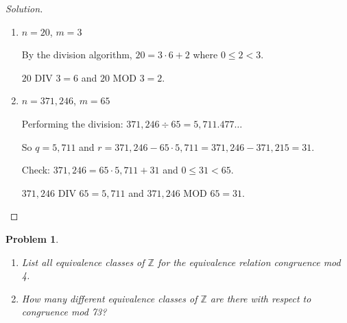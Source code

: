 \documentclass[12pt]{article}
\newtheorem{problem}{Problem}
\newcommand{\ZZ}{\ensuremath{\mathbb Z}}
\begin{document}
\begin{proof}[Solution]
~
\begin{enumerate}[label=(\alph*)]
    \item $n = 20$, $m = 3$
    
    By the division algorithm, $20 = 3 \cdot 6 + 2$ where $0 \leq 2 < 3$.
    
    $20$ DIV $3 = 6$ and $20$ MOD $3 = 2$.
    
    \setcounter{enumi}{4}
    
    \item $n = 371{,}246$, $m = 65$
    
    Performing the division: $371{,}246 \div 65 = 5{,}711.477\ldots$
    
    So $q = 5{,}711$ and $r = 371{,}246 - 65 \cdot 5{,}711 = 371{,}246 - 371{,}215 = 31$.
    
    Check: $371{,}246 = 65 \cdot 5{,}711 + 31$ and $0 \leq 31 < 65$.
    
    $371{,}246$ DIV $65 = 5{,}711$ and $371{,}246$ MOD $65 = 31$.
\end{enumerate}
\end{proof}

\setcounter{problem}{3}
\begin{problem}
\begin{enumerate}[label=(\alph*)]
    \item List all equivalence classes of $\ZZ$ for the equivalence relation congruence mod 4.
    
    \item How many different equivalence classes of $\ZZ$ are there with respect to congruence mod 73?
\end{enumerate}
\end{problem}
\end{document}
